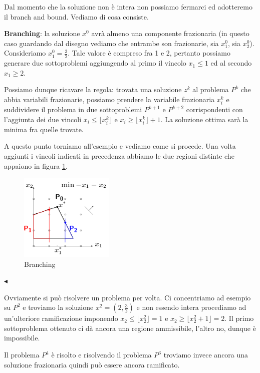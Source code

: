 \documentclass[11pt]{book}
\begin{document}
Dal momento che la soluzione non \`e intera non possiamo fermarci ed
adotteremo il branch and bound. Vediamo di cosa consiste.

{\bf Branching}: la soluzione $x^0$ avr\`a almeno una componente
frazionaria (in questo caso guardando dal disegno vediamo che entrambe
son frazionarie, sia $x_1^0$, sia $x_2^0$). Consideriamo $x_1^0 =
\frac{3}{2}$. Tale valore \`e compreso fra 1 e 2, pertanto possiamo
generare due sottoproblemi aggiungendo al primo il vincolo $x_1 \leq
1$ ed al secondo $x_1 \geq 2$.
 
Possiamo dunque ricavare la regola: trovata una soluzione $z^k$ al
problema $P^k$ che abbia variabili frazionarie, possiamo prendere la
variabile frazionaria $x_i^k$ e suddividere il problema in due
sottoproblemi $P^{k+1}$ e $P^{k+2}$ corrispondenti con l'aggiunta dei
due vincoli $x_i \leq \lfloor x_i^k \rfloor$ e $x_i \geq \lfloor x_i^k
\rfloor + 1$. La soluzione ottima sar\`a la minima fra quelle trovate.

A questo punto torniamo all'esempio e vediamo come si procede. Una
volta aggiunti i vincoli indicati in precedenza abbiamo le due regioni
distinte che appaiono in figura \ref{cap6fig66bis}.

\begin{figure}[h!]
  \centering
  \includegraphics[width=0.4\textwidth]{images/cap6fig66bis.png}
  \caption{Branching}
  \label{cap6fig66bis}
\end{figure}
$\blacktriangleleft$
\vspace{11pt}

Ovviamente si pu\`o risolvere un problema per volta. Ci concentriamo
ad esempio su $P^2$ e troviamo la soluzione $x^2 = (2,\frac{3}{2})$ e
non essendo intera procediamo ad un'ulteriore ramificazione imponendo
$x_2 \leq \lfloor x_2^2 \rfloor = 1$ e $x_2 \geq \lfloor x_2^2 + 1
\rfloor = 2$. Il primo sottoproblema ottenuto ci d\`a ancora una
regione ammissibile, l'altro no, dunque \`e impossibile.

Il problema $P^4$ \`e risolto e risolvendo il problema $P^3$ troviamo
invece ancora una soluzione frazionaria quindi pu\`o essere ancora
ramificato.
\end{document}
